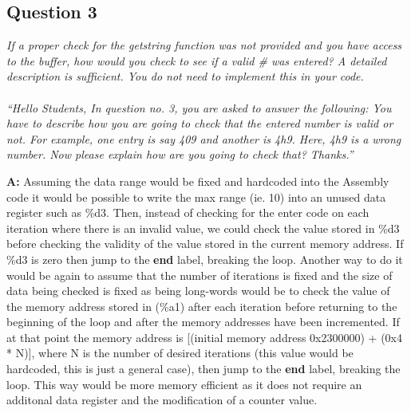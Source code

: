 \documentclass[letterpaper]{article}
\begin{document}
      \subsection{Question 3} \textit{If a proper check for the getstring
      function was not provided and you have access to the buffer, how would you
      check to see if a valid \# was entered? A detailed description is
      sufficient. You do not need to implement this in your code.
      \\ \\
      ``Hello Students,
		In question no. 3, you are asked to answer the following:
		You have to describe how you are going to check that the entered number is valid or not.
		For example, one entry is say 409 and another is 4h9. Here, 4h9 is a wrong number. Now please explain how are you going to check that?
		Thanks.''}

      \noindent\textbf{A:}
        Assuming the data range would be fixed and hardcoded into the Assembly code it would be possible to
        write the max range (ie. 10) into an unused data register such as \%d3.  Then, instead of checking
        for the enter code on each iteration where there is an invalid value, we could check the value stored in
        \%d3 before checking the validity of the value stored in the current memory address.  If \%d3 is
        zero then jump to the \textbf{end} label, breaking the loop.  Another way to do it would be again
        to assume that the number of iterations is fixed and the size of data being checked is fixed as being
        long-words would be to check the value of the memory address stored in (\%a1) after each iteration
        before returning to the beginning of the loop and after the memory addresses have been incremented.
        If at that point the memory address is [(initial memory address 0x2300000) + (0x4 * N)], where N is
        the number of desired iterations (this value would be hardcoded, this is just a general case), then
        jump to the \textbf{end} label, breaking the loop.  This way would be more memory efficient as it
        does not require an additonal data register and the modification of a counter value.
\end{document}
